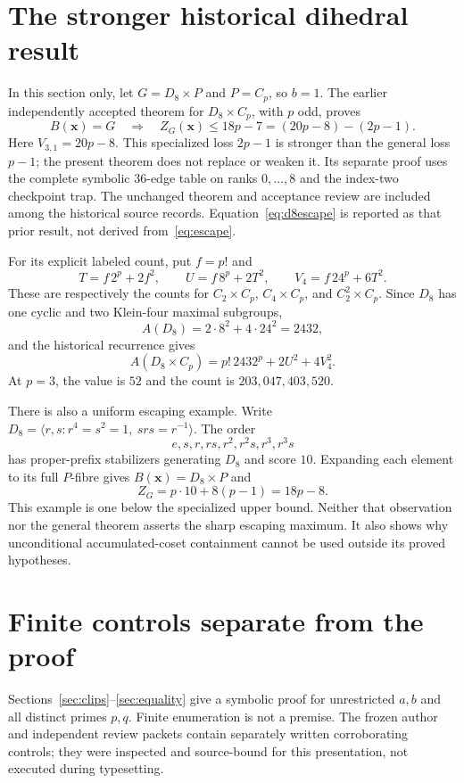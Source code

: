 \documentclass[11pt,letterpaper]{article}
\theoremstyle{definition}\newtheorem{definition}{Definition}
\begin{document}
\section{The stronger historical dihedral result}\label{sec:d8}
In this section only, let $G=D_8\times P$ and $P=C_p$, so $b=1$. The earlier independently accepted theorem for $D_8\times C_p$, with $p$ odd, proves
\begin{equation}
B(\mathbf{x})=G\quad\Longrightarrow\quad
Z_G(\mathbf{x})\le18p-7=(20p-8)-(2p-1).\label{eq:d8escape}
\end{equation}
Here $V_{3,1}=20p-8$. This specialized loss $2p-1$ is stronger than the general loss $p-1$; the present theorem does not replace or weaken it. Its separate proof uses the complete symbolic 36-edge table on ranks $0,\ldots,8$ and the index-two checkpoint trap. The unchanged theorem and acceptance review are included among the historical source records. Equation~\eqref{eq:d8escape} is reported as that prior result, not derived from~\eqref{eq:escape}.

For its explicit labeled count, put $f=p!$ and
\[
T=f\,2^p+2f^2,\qquad U=f\,8^p+2T^2,\qquad V_4=f\,24^p+6T^2.
\]
These are respectively the counts for $C_2\times C_p$, $C_4\times C_p$, and $C_2^2\times C_p$. Since $D_8$ has one cyclic and two Klein-four maximal subgroups,
\[
A(D_8)=2\cdot8^2+4\cdot24^2=2432,
\]
and the historical recurrence gives
\begin{equation}
A(D_8\times C_p)=p!\,2432^p+2U^2+4V_4^2.\label{eq:d8count}
\end{equation}
At $p=3$, the value is $52$ and the count is $203{,}047{,}403{,}520$.

There is also a uniform escaping example. Write
$D_8=\langle r,s:r^4=s^2=1,\ srs=r^{-1}\rangle$. The order
\[
e,s,r,rs,r^2,r^2s,r^3,r^3s
\]
has proper-prefix stabilizers generating $D_8$ and score $10$. Expanding each element to its full $P$-fibre gives $B(\mathbf{x})=D_8\times P$ and
\[
Z_G=p\cdot10+8(p-1)=18p-8.
\]
This example is one below the specialized upper bound. Neither that observation nor the general theorem asserts the sharp escaping maximum. It also shows why unconditional accumulated-coset containment cannot be used outside its proved hypotheses.

\section{Finite controls separate from the proof}\label{sec:controls}
Sections~\ref{sec:clips}--\ref{sec:equality} give a symbolic proof for unrestricted $a,b$ and all distinct primes $p,q$. Finite enumeration is not a premise. The frozen author and independent review packets contain separately written corroborating controls; they were inspected and source-bound for this presentation, not executed during typesetting.
\end{document}
